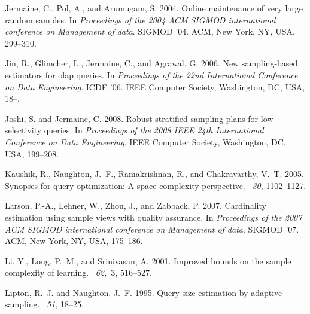 \begin{thebibliography}{}
{\sc Jermaine, C.}, {\sc Pol, A.}, {\sc and} {\sc Arumugam, S.} 2004.
\newblock Online maintenance of very large random samples.
\newblock In {\em Proceedings of the 2004 ACM SIGMOD international conference
  on Management of data}. SIGMOD '04. ACM, New York, NY, USA, 299--310.

{\sc Jin, R.}, {\sc Glimcher, L.}, {\sc Jermaine, C.}, {\sc and} {\sc Agrawal,
  G.} 2006.
\newblock New sampling-based estimators for olap queries.
\newblock In {\em Proceedings of the 22nd International Conference on Data
  Engineering}. ICDE '06. IEEE Computer Society, Washington, DC, USA, 18--.

{\sc Joshi, S.} {\sc and} {\sc Jermaine, C.} 2008.
\newblock Robust stratified sampling plans for low selectivity queries.
\newblock In {\em Proceedings of the 2008 IEEE 24th International Conference on
  Data Engineering}. IEEE Computer Society, Washington, DC, USA, 199--208.

{\sc Kaushik, R.}, {\sc Naughton, J.~F.}, {\sc Ramakrishnan, R.}, {\sc and}
  {\sc Chakravarthy, V.~T.} 2005.
\newblock Synopses for query optimization: A space-complexity perspective.
~{\em 30}, 1102--1127.

{\sc Larson, P.-A.}, {\sc Lehner, W.}, {\sc Zhou, J.}, {\sc and} {\sc Zabback,
  P.} 2007.
\newblock Cardinality estimation using sample views with quality assurance.
\newblock In {\em Proceedings of the 2007 ACM SIGMOD international conference
  on Management of data}. SIGMOD '07. ACM, New York, NY, USA, 175--186.

{\sc Li, Y.}, {\sc Long, P.~M.}, {\sc and} {\sc Srinivasan, A.} 2001.
\newblock Improved bounds on the sample complexity of learning.
~{\em 62,\/}~3,
  516--527.

{\sc Lipton, R.~J.} {\sc and} {\sc Naughton, J.~F.} 1995.
\newblock Query size estimation by adaptive sampling.
~{\em 51}, 18--25.


\end{thebibliography}
